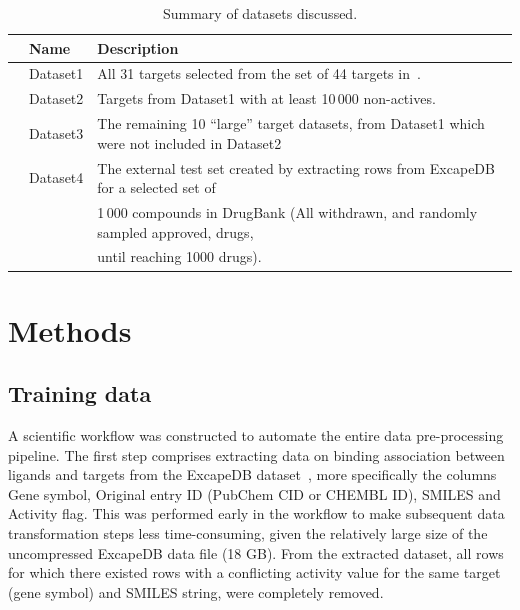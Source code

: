 \documentclass[utf8]{frontiersSCNS} %
\begin{document}
\begin{table}[p]
\small
\centering
\caption{Summary of datasets discussed.}
\label{tbl:datasets}
\begin{tabular}{rll}
\toprule
& Name     & Description \\
\midrule
& Dataset1 & All 31 targets selected from the set of 44 targets in~\cite{Bowes2012}. \\
& Dataset2 & Targets from Dataset1 with at least 10\,000 non-actives. \\
& Dataset3 & The remaining 10 ``large'' target datasets, from Dataset1 which were not included in Dataset2 \\
& Dataset4 & The external test set created by extracting rows from ExcapeDB for a selected set of \\
&          & 1\,000 compounds in DrugBank (All withdrawn, and randomly sampled approved, drugs,\\
&          & until reaching 1000 drugs). \\
\bottomrule
\end{tabular}
\end{table}

\section*{Methods}

\subsection*{Training data}

A scientific workflow was constructed to automate the entire data
pre-processing pipeline.  The first step comprises extracting data on binding association
between ligands and targets from the ExcapeDB dataset~\cite{Sun2017}, more
specifically the columns Gene symbol, Original entry ID (PubChem CID or CHEMBL
ID), SMILES and Activity flag. This was performed early in the workflow to make
subsequent data transformation steps less time-consuming, given the relatively large
size of the uncompressed ExcapeDB data file (18 GB).
%
From the extracted dataset, all rows for which there existed rows with a conflicting
activity value for the same target (gene symbol) and SMILES string, were completely removed.
\end{document}
